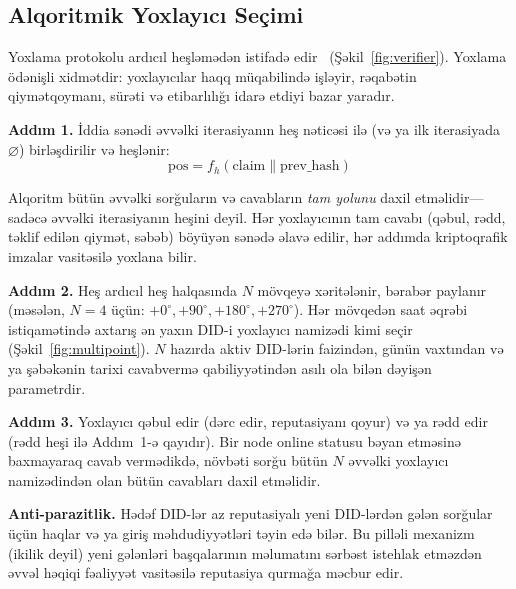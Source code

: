 \documentclass[11pt,a4paper,twocolumn]{article}
\begin{document}
\subsection{Alqoritmik Yoxlayıcı Seçimi}

Yoxlama protokolu ardıcıl heşləmədən istifadə edir~\cite{karger1997} (Şəkil~\ref{fig:verifier}). Yoxlama ödənişli xidmətdir: yoxlayıcılar haqq müqabilində işləyir, rəqabətin qiymətqoymanı, sürəti və etibarlılığı idarə etdiyi bazar yaradır.

\textbf{Addım 1.} İddia sənədi əvvəlki iterasiyanın heş nəticəsi ilə (və ya ilk iterasiyada $\varnothing$) birləşdirilir və heşlənir:
\begin{equation}
\text{pos} = f_h(\text{claim} \| \text{prev\_hash})
\label{eq:hash}
\end{equation}

Alqoritm bütün əvvəlki sorğuların və cavabların \emph{tam yolunu} daxil etməlidir---sadəcə əvvəlki iterasiyanın heşini deyil. Hər yoxlayıcının tam cavabı (qəbul, rədd, təklif edilən qiymət, səbəb) böyüyən sənədə əlavə edilir, hər addımda kriptoqrafik imzalar vasitəsilə yoxlana bilir.

\textbf{Addım 2.} Heş ardıcıl heş halqasında $N$ mövqeyə xəritələnir, bərabər paylanır (məsələn, $N=4$ üçün: $+0^{\circ}, +90^{\circ}, +180^{\circ}, +270^{\circ}$). Hər mövqedən saat əqrəbi istiqamətində axtarış ən yaxın DID-i yoxlayıcı namizədi kimi seçir (Şəkil~\ref{fig:multipoint}). $N$ hazırda aktiv DID-lərin faizindən, günün vaxtından və ya şəbəkənin tarixi cavabvermə qabiliyyətindən asılı ola bilən dəyişən parametrdir.

\textbf{Addım 3.} Yoxlayıcı qəbul edir (dərc edir, reputasiyanı qoyur) və ya rədd edir (rədd heşi ilə Addım~1-ə qayıdır). Bir node online statusu bəyan etməsinə baxmayaraq cavab vermədikdə, növbəti sorğu bütün $N$ əvvəlki yoxlayıcı namizədindən olan bütün cavabları daxil etməlidir.

\textbf{Anti-parazitlik.} Hədəf DID-lər az reputasiyalı yeni DID-lərdən gələn sorğular üçün haqlar və ya giriş məhdudiyyətləri təyin edə bilər. Bu pilləli mexanizm (ikilik deyil) yeni gələnləri başqalarının məlumatını sərbəst istehlak etməzdən əvvəl həqiqi fəaliyyət vasitəsilə reputasiya qurmağa məcbur edir.
\end{document}
